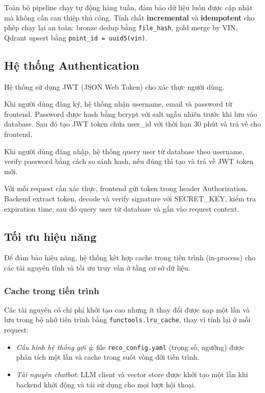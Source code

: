 Toàn bộ pipeline chạy tự động hàng tuần, đảm bảo dữ liệu luôn được cập nhật mà không cần can thiệp thủ công. Tính chất \textbf{incremental} và \textbf{idempotent} cho phép chạy lại an toàn: bronze dedup bằng \texttt{file\_hash}, gold merge by VIN, Qdrant upsert bằng \texttt{point\_id = uuid5(vin)}.

\subsection{Hệ thống Authentication}

Hệ thống sử dụng JWT (JSON Web Token) cho xác thực người dùng.

Khi người dùng đăng ký, hệ thống nhận username, email và password từ frontend. Password được hash bằng bcrypt với salt ngẫu nhiên trước khi lưu vào database. Sau đó tạo JWT token chứa user\_id với thời hạn 30 phút và trả về cho frontend.

Khi người dùng đăng nhập, hệ thống query user từ database theo username, verify password bằng cách so sánh hash, nếu đúng thì tạo và trả về JWT token mới.

Với mỗi request cần xác thực, frontend gửi token trong header Authorization. Backend extract token, decode và verify signature với SECRET\_KEY, kiểm tra expiration time, sau đó query user từ database và gắn vào request context.

\subsection{Tối ưu hiệu năng}

Để đảm bảo hiệu năng, hệ thống kết hợp cache trong tiến trình (in-process) cho các tài nguyên tĩnh và tối ưu truy vấn ở tầng cơ sở dữ liệu.

\subsubsection{Cache trong tiến trình}

Các tài nguyên có chi phí khởi tạo cao nhưng ít thay đổi được nạp một lần và lưu trong bộ nhớ tiến trình bằng \texttt{functools.lru\_cache}, thay vì tính lại ở mỗi request:

\begin{itemize}
    \item \textit{Cấu hình hệ thống gợi ý}: file \texttt{reco\_config.yaml} (trọng số, ngưỡng) được phân tích một lần và cache trong suốt vòng đời tiến trình.
    \item \textit{Tài nguyên chatbot}: LLM client và vector store được khởi tạo một lần khi backend khởi động và tái sử dụng cho mọi lượt hội thoại.
\end{itemize}

